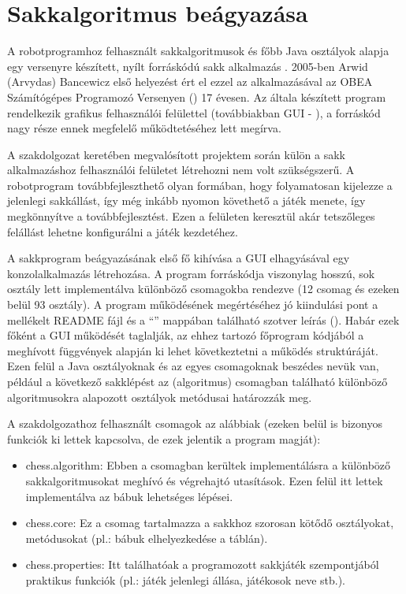 \documentclass[../documentation.tex]{subfiles}
\begin{document}
\section{Sakkalgoritmus beágyazása}
A robotprogramhoz felhasznált sakkalgoritmusok és főbb Java osztályok alapja egy versenyre készített, nyílt forráskódú sakk alkalmazás \cite{chessgui}. 2005-ben Arwid (Arvydas) Bancewicz első helyezést ért el ezzel az alkalmazásával az OBEA Számítógépes Programozó Versenyen () 17 évesen. Az általa készített program rendelkezik grafikus felhasználói felülettel (továbbiakban GUI - ), a forráskód nagy része ennek megfelelő működtetéséhez lett megírva.

A szakdolgozat keretében megvalósított projektem során külön a sakk alkalmazáshoz felhasználói felületet létrehozni nem volt szükségszerű. A robotprogram továbbfejleszthető olyan formában, hogy folyamatosan kijelezze a jelenlegi sakkállást, így még inkább nyomon követhető a játék menete, így megkönnyítve a továbbfejlesztést. Ezen a felületen keresztül akár tetszőleges felállást lehetne konfigurálni a játék kezdetéhez.

A sakkprogram beágyazásának első fő kihívása a GUI elhagyásával egy konzolalkalmazás létrehozása. A program forráskódja viszonylag hosszú, sok osztály lett implementálva különböző csomagokba rendezve (12 csomag és ezeken belül 93 osztály). A program működésének megértéséhez jó kiindulási pont a mellékelt README fájl és a ``'' mappában található szotver leírás ()\cite{chessgui}. Habár ezek főként a GUI működését taglalják, az ehhez tartozó főprogram kódjából a meghívott függvények alapján ki lehet következtetni a működés struktúráját. Ezen felül a Java osztályoknak és az egyes csomagoknak beszédes nevük van, például a következő sakklépést az  (algoritmus) csomagban található különböző algoritmusokra alapozott osztályok metódusai határozzák meg.

A szakdolgozathoz felhasznált csomagok az alábbiak (ezeken belül is bizonyos funkciók ki lettek kapcsolva, de ezek jelentik a program magját):
\begin{itemize}
	\item chess.algorithm: Ebben a csomagban kerültek implementálásra a különböző sakkalgoritmusokat meghívó és végrehajtó utasítások. Ezen felül itt lettek implementálva az bábuk lehetséges lépései.
	\item chess.core: Ez a csomag tartalmazza a sakkhoz szorosan kötődő osztályokat, metódusokat (pl.: bábuk elhelyezkedése a táblán).
	\item chess.properties: Itt találhatóak a programozott sakkjáték szempontjából praktikus funkciók (pl.: játék jelenlegi állása, játékosok neve stb.).
\end{itemize}
\end{document}
